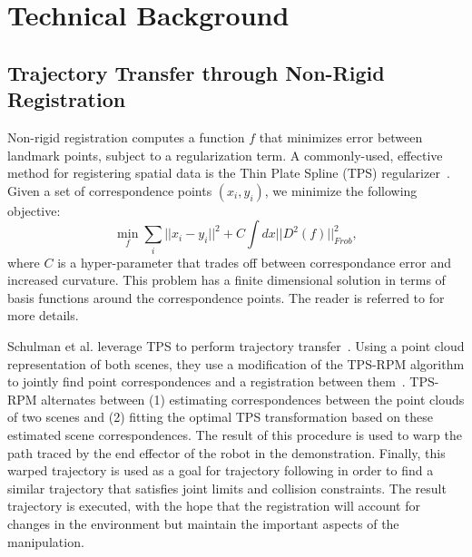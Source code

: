 \section{Technical Background}

\subsection{Trajectory Transfer through Non-Rigid Registration}
Non-rigid registration computes a function $f$ that minimizes error between landmark points, subject to a regularization term.
A commonly-used, effective method for registering spatial data is the Thin Plate Spline (TPS) regularizer~\cite{Carr_SIGGRAPH2001, Wahba_TPS1990}.
Given a set of correspondence points $(x_i, y_i)$, we minimize the following objective:
$$\min_f \sum_i ||x_i - y_i||^2 + C\int dx ||D^2(f)||^2_{Frob},$$
where $C$ is a hyper-parameter that trades off between correspondance error and increased curvature.
This problem has a finite dimensional solution in terms of basis functions around the correspondence points.
The reader is referred to  for more details.

Schulman et al. leverage TPS to perform trajectory transfer~\cite{Schulmanetal_ISRR2013}.
Using a point cloud representation of both scenes, they use a modification of the TPS-RPM algorithm to jointly find point correspondences and a registration between them~\cite{Chui_CVIU2003}.
TPS-RPM alternates between (1) estimating correspondences between the point clouds of two scenes and (2) fitting the optimal TPS transformation based on these estimated scene correspondences. 
The result of this procedure is used to warp the path traced by the end effector of the robot in the demonstration.
Finally, this warped trajectory is used as a goal for trajectory following in order to find a similar trajectory that satisfies joint limits and collision constraints.
The result trajectory is executed, with the hope that the registration will account for changes in the environment but maintain the important aspects of the manipulation.


